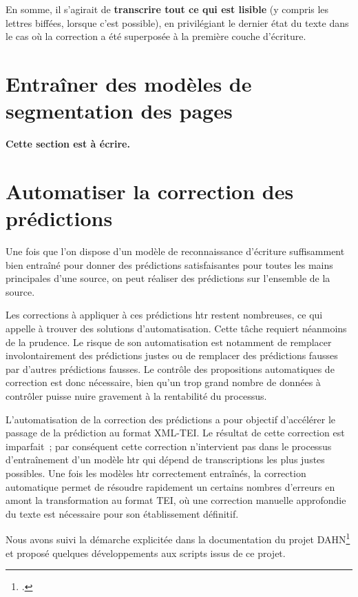 \documentclass[a4paper,12pt,twoside]{book}
\begin{document}
				En somme, il s'agirait de \textbf{transcrire tout ce qui est lisible} (y compris les lettres biffées, lorsque c'est possible), en privilégiant le dernier état du texte dans le cas où la correction a été superposée à la première couche d'écriture.
		
		\section{Entraîner des modèles de segmentation des pages}
       		\textbf{Cette section est à écrire.}
			
		\section{Automatiser la correction des prédictions}
			Une fois que l'on dispose d'un modèle de reconnaissance d'écriture suffisamment bien entraîné pour donner des prédictions satisfaisantes pour toutes les mains principales d'une source, on peut réaliser des prédictions sur l'ensemble de la source.
			
			Les corrections à appliquer à ces prédictions \gls{htr} restent nombreuses, ce qui appelle à trouver des solutions d'automatisation. Cette tâche requiert néanmoins de la prudence. Le risque de son automatisation est notamment de remplacer involontairement des prédictions justes ou de remplacer des prédictions fausses par d'autres prédictions fausses. Le contrôle des propositions automatiques de correction est donc nécessaire, bien qu'un trop grand nombre de données à contrôler puisse nuire gravement à la rentabilité du processus.
			
			L'automatisation de la correction des prédictions a pour objectif d'accélérer le passage de la prédiction au format XML-TEI. Le résultat de cette correction est imparfait~; par conséquent cette correction n'intervient pas dans le processus d'entraînement d'un modèle \gls{htr} qui dépend de transcriptions les plus justes possibles. Une fois les modèles \gls{htr} correctement entraînés, la correction automatique permet de résoudre rapidement un certains nombres d'erreurs en amont la transformation au format TEI, où une correction manuelle approfondie du texte est nécessaire pour son établissement définitif.
			
			Nous avons suivi la démarche explicitée dans la documentation du projet DAHN\footcite{chiffoleauHowPostOCRCorrection2022} et proposé quelques développements aux scripts issus de ce projet.
			
\end{document}
